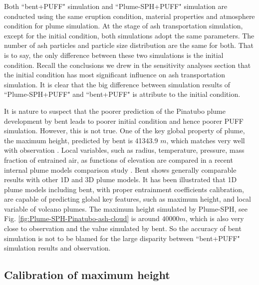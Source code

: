 Both ``bent+PUFF" simulation and ``Plume-SPH+PUFF" simulation are conducted using the same eruption condition, material properties and atmosphere condition for plume simulation. At the stage of ash transportation simulation, except for the initial condition, both simulations adopt the same parameters. The number of ash particles and particle size distribution are the same for both. That is to say, the only difference between these two simulations is the initial condition. Recall the conclusions we drew in the sensitivity analyses section that the initial condition has most significant influence on ash transportation simulation. It is clear that the big difference between simulation results of ``Plume-SPH+PUFF" and ``bent+PUFF" is attribute to the initial condition.

It is nature to suspect that the poorer prediction of the Pinatubo plume development by bent leads to poorer initial condition and hence poorer PUFF simulation. However, this is not true. One of the key global property of plume, the maximum height, predicted by bent is 41343.9 $m$, which matches very well with observation \citep{lynch1996mount}. Local variables, such as radius, temperature, pressure, mass fraction of entrained air, as functions of elevation are compared in a recent internal plume models comparison study \citep{costa2016results}. Bent shows generally comparable results with other 1D and 3D plume models. It has been illustrated that 1D plume models including bent, with proper entrainment coefficients calibration, are capable of predicting global key features, such as maximum height, and local variable of volcano plumes. The maximum height simulated by Plume-SPH, see Fig. \ref{fig:Plume-SPH-Pinatubo-ash-cloud} is around $40000 m$, which is also very close to observation and the value simulated by bent. So the accuracy of bent simulation is not to be blamed for the large disparity between ``bent+PUFF" simulation results and observation.

\subsection{Calibration of maximum height}

